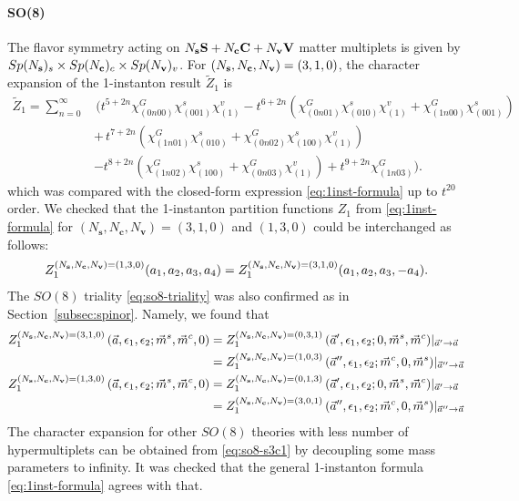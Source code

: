 \documentclass[letterpaper, 11pt]{article}
\newcommand{\nn}{\nonumber}
\begin{document}
{\paragraph{SO(8)} The flavor symmetry acting on $N_{\bf s} \mathbf{S} + N_{\bf c} \mathbf{C} + N_{\bf v} \mathbf{V}$ matter multiplets is given by $Sp(N_{\bf s})_s \times Sp(N_{\bf c})_c \times Sp(N_{\bf v})_v$. For $(N_{\bf s}, N_{\bf c}, N_{\bf v}) = (3,1,0)$, the character expansion of the 1-instanton result $\tilde{Z}_1$ is 
\begin{align}
  \label{eq:so8-s3c1}
\tilde{Z}_1=\sum_{n=0}^{\infty}&\,\Big(t^{5+2n}\chi^G_{(0n00)}\chi^s_{(001)}\chi^v_{(1)}-t^{6+2n}(\chi^G_{(0n01)}\chi^s_{(010)}\chi^v_{(1)}+\chi^G_{(1n00)}\chi^s_{(001)})\nn\\
&+\,t^{7+2n}(\chi^G_{(1n01)}\chi^s_{(010)}+\chi^G_{(0n02)}\chi^s_{(100)}\chi^v_{(1)})\\
&-t^{8+2n}(\chi^G_{(1n02)}\chi^s_{(100)}+\chi^G_{(0n03)}\chi^v_{(1)})+t^{9+2n}\chi^G_{(1n03)}\Big)\nn.
\end{align}
which was compared with the closed-form expression \eqref{eq:1inst-formula} up to $t^{20}$ order.
We checked that the 1-instanton partition functions ${Z}_1$ from \eqref{eq:1inst-formula} for $(N_\mathbf{s},N_\mathbf{c}, N_{\mathbf{v}})= (3,1,0)$ and $(1,3,0)$ could be interchanged as follows: 
\begin{align}
  Z_{1}^{(N_{\bf s}, N_{\bf c}, N_{\bf v}) = (1,3,0)}(a_1,a_2,a_3,a_4) = Z_{1}^{(N_{\bf s}, N_{\bf c}, N_{\bf v}) = (3,1,0)}(a_1,a_2,a_3,-a_4).
\end{align}
The $SO(8)$ triality \eqref{eq:so8-triality} was also confirmed as in Section~\ref{subsec:spinor}. Namely, we found that 
\begin{align}
  \begin{split}
  Z_1^{(N_{\bf s}, N_{\bf c}, N_{\bf v}) = (3,1,0)}\,(\vec{a}, \epsilon_1,\epsilon_2;\vec{m}^s,\vec{m}^c,0)  &= Z_1^{(N_{\bf s}, N_{\bf c}, N_{\bf v}) = (0,3,1)}\,(\vec{a}', \epsilon_1,\epsilon_2;0,\vec{m}^s,\vec{m}^c)|_{\vec{a}' \rightarrow \vec{a}}\\
  &= Z_1^{(N_{\bf s}, N_{\bf c}, N_{\bf v}) = (1,0,3)}\,(\vec{a}'', \epsilon_1,\epsilon_2;\vec{m}^c,0,\vec{m}^s)|_{\vec{a}'' \rightarrow \vec{a}}
  \end{split}\\
  \begin{split}
    Z_1^{(N_{\bf s}, N_{\bf c}, N_{\bf v}) = (1,3,0)}\,(\vec{a}, \epsilon_1,\epsilon_2;\vec{m}^s,\vec{m}^c,0)  &= Z_1^{(N_{\bf s}, N_{\bf c}, N_{\bf v}) = (0,1,3)}\,(\vec{a}', \epsilon_1,\epsilon_2;0,\vec{m}^s,\vec{m}^c)|_{\vec{a}' \rightarrow \vec{a}}\\
    &= Z_1^{(N_{\bf s}, N_{\bf c}, N_{\bf v}) = (3,0,1)}\,(\vec{a}'', \epsilon_1,\epsilon_2;\vec{m}^c,0,\vec{m}^s)|_{\vec{a}'' \rightarrow \vec{a}}
    \end{split}
\end{align}
The character expansion for other $SO(8)$ theories with less number of hypermultiplets can be obtained from \eqref{eq:so8-s3c1} by decoupling some mass parameters to infinity. It was checked that the general 1-instanton formula \eqref{eq:1inst-formula} agrees with that.



}
\end{document}
